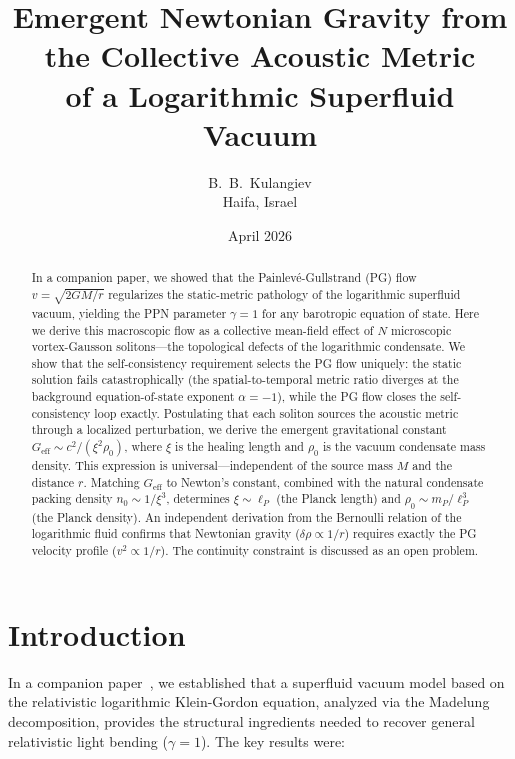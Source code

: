 \documentclass[12pt, a4paper]{article}
\newcommand{\Geff}{G_{\mathrm{eff}}}
\begin{document}
\title{Emergent Newtonian Gravity from the Collective Acoustic Metric\\of a Logarithmic Superfluid Vacuum}

\author{B.~B.~Kulangiev\\\small{Haifa, Israel}}
\date{April 2026}
\maketitle

\begin{abstract}
\noindent In a companion paper, we showed that the Painlev\'{e}-Gullstrand (PG) flow $v = \sqrt{2GM/r}$ regularizes the static-metric pathology of the logarithmic superfluid vacuum, yielding the PPN parameter $\gamma = 1$ for any barotropic equation of state. Here we derive this macroscopic flow as a collective mean-field effect of $N$ microscopic vortex-Gausson solitons---the topological defects of the logarithmic condensate. We show that the self-consistency requirement selects the PG flow uniquely: the static solution fails catastrophically (the spatial-to-temporal metric ratio diverges at the background equation-of-state exponent $\alpha = -1$), while the PG flow closes the self-consistency loop exactly. Postulating that each soliton sources the acoustic metric through a localized perturbation, we derive the emergent gravitational constant $\Geff \sim c^2/(\xi^2\rho_0)$, where $\xi$ is the healing length and $\rho_0$ is the vacuum condensate mass density. This expression is universal---independent of the source mass $M$ and the distance $r$. Matching $\Geff$ to Newton's constant, combined with the natural condensate packing density $n_0 \sim 1/\xi^3$, determines $\xi \sim \ell_P$ (the Planck length) and $\rho_0 \sim m_P/\ell_P^3$ (the Planck density). An independent derivation from the Bernoulli relation of the logarithmic fluid confirms that Newtonian gravity ($\delta\rho \propto 1/r$) requires exactly the PG velocity profile ($v^2 \propto 1/r$). The continuity constraint is discussed as an open problem.
\end{abstract}


\section{Introduction}
\label{sec:intro}

In a companion paper~\cite{kulangiev_2026}, we established that a superfluid vacuum model based on the relativistic logarithmic Klein-Gordon equation, analyzed via the Madelung decomposition, provides the structural ingredients needed to recover general relativistic light bending ($\gamma = 1$). The key results were:
\end{document}
